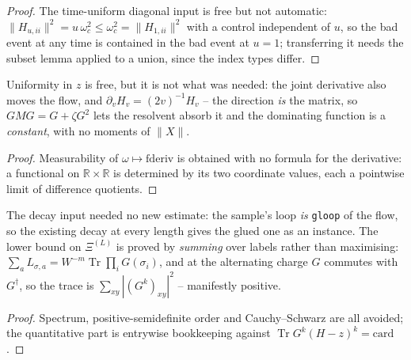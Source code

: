 \begin{proof}\leanok
  The time-uniform diagonal input is free but not automatic:
  $\|H_{u,ii}\|^2=u\,\omega_c^2\le\omega_c^2=\|H_{1,ii}\|^2$ with a control independent of $u$,
  so the bad event at any time is contained in the bad event at $u=1$; transferring it needs the
  subset lemma applied to a union, since the index types differ.
\end{proof}

\begin{lemma}\label{lem:loopjoint}
  \leanok{}
  Uniformity in $z$ is free, but it is not what was needed: the joint derivative also moves the
  flow, and $\partial_vH_v=(2v)^{-1}H_v$ -- the direction \emph{is} the matrix, so
  $GMG=G+\zeta G^2$ lets the resolvent absorb it and the dominating function is a \emph{constant},
  with no moments of $\|X\|$.
\end{lemma}
\begin{proof}\leanok
  Measurability of $\omega\mapsto\mathrm{fderiv}$ is obtained with no formula for the derivative: a
  functional on $\mathbb R\times\mathbb R$ is determined by its two coordinate values, each a
  pointwise limit of difference quotients.
\end{proof}

\begin{lemma}\label{lem:xilow}
  \leanok{}
  The decay input needed no new estimate: the sample's loop \emph{is} \texttt{gloop} of the flow, so
  the existing decay at every length gives the glued one as an instance. The lower bound on
  $\Xi^{(L)}$ is proved by \emph{summing} over labels rather than maximising:
  $\sum_aL_{\sigma,a}=W^{-m}\operatorname{Tr}\prod_iG(\sigma_i)$, and at the alternating charge
  $G$ commutes with $G^\dagger$, so the trace is $\sum_{xy}|(G^k)_{xy}|^2$ -- manifestly positive.
\end{lemma}
\begin{proof}\leanok
  Spectrum, positive-semidefinite order and Cauchy--Schwarz are all avoided; the quantitative part
  is entrywise bookkeeping against $\operatorname{Tr}G^k(H-z)^k=\mathrm{card}$.
\end{proof}

